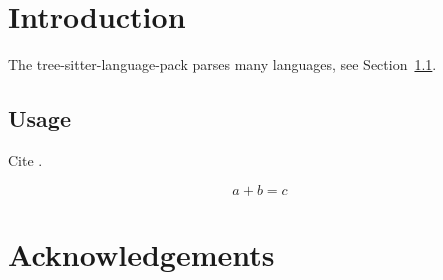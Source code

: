 \documentclass{article}
\newcommand{\pack}{tree-sitter-language-pack}
\begin{document}
\section{Introduction}\label{sec:intro}
The \pack{} parses many languages, see Section~\ref{sec:usage}.

\subsection{Usage}\label{sec:usage}
Cite \cite{knuth84}.

\begin{equation}\label{eq:sum}
  a + b = c
\end{equation}

\section*{Acknowledgements}
\end{document}
